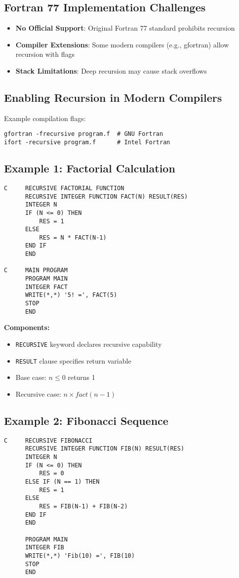 \documentclass{book}
\begin{document}
\subsection*{Fortran 77 Implementation Challenges}
\begin{itemize}
\item \textbf{No Official Support}: Original Fortran 77 standard prohibits recursion
\item \textbf{Compiler Extensions}: Some modern compilers (e.g., gfortran) allow recursion with flags
\item \textbf{Stack Limitations}: Deep recursion may cause stack overflows
\end{itemize}

\subsection*{Enabling Recursion in Modern Compilers}
Example compilation flags:
\begin{verbatim}
gfortran -frecursive program.f  # GNU Fortran
ifort -recursive program.f      # Intel Fortran
\end{verbatim}

\subsection*{Example 1: Factorial Calculation}
\begin{verbatim}
C     RECURSIVE FACTORIAL FUNCTION
      RECURSIVE INTEGER FUNCTION FACT(N) RESULT(RES)
      INTEGER N
      IF (N <= 0) THEN
          RES = 1
      ELSE
          RES = N * FACT(N-1)
      END IF
      END

C     MAIN PROGRAM
      PROGRAM MAIN
      INTEGER FACT
      WRITE(*,*) '5! =', FACT(5)
      STOP
      END
\end{verbatim}

\textbf{Components:}
\begin{itemize}
\item \texttt{RECURSIVE} keyword declares recursive capability
\item \texttt{RESULT} clause specifies return variable
\item Base case: \( n \leq 0 \) returns 1
\item Recursive case: \( n \times fact(n-1) \)
\end{itemize}

\subsection*{Example 2: Fibonacci Sequence}
\begin{verbatim}
C     RECURSIVE FIBONACCI
      RECURSIVE INTEGER FUNCTION FIB(N) RESULT(RES)
      INTEGER N
      IF (N <= 0) THEN
          RES = 0
      ELSE IF (N == 1) THEN
          RES = 1
      ELSE
          RES = FIB(N-1) + FIB(N-2)
      END IF
      END

      PROGRAM MAIN
      INTEGER FIB
      WRITE(*,*) 'Fib(10) =', FIB(10)
      STOP
      END
\end{verbatim}
\end{document}
